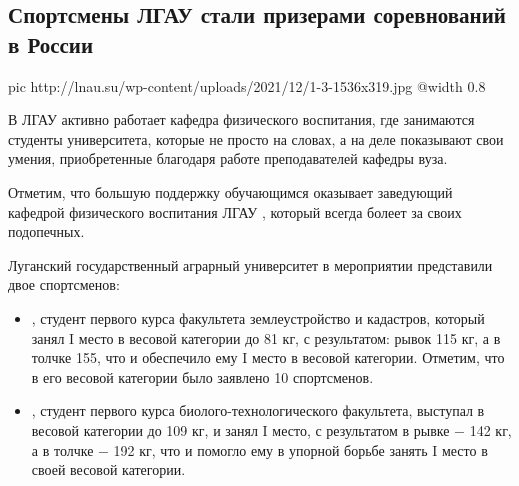  
 
 
 
 
\subsection{Спортсмены ЛГАУ стали призерами соревнований в России}
\label{sec:07_12_2021.stz.edu.lnr.lgau.1.prizery_sorevy_rossia}



\ifcmt
  pic http://lnau.su/wp-content/uploads/2021/12/1-3-1536x319.jpg
  @width 0.8
\fi

В ЛГАУ активно работает кафедра физического воспитания, где занимаются студенты
университета, которые не просто на словах, а на деле показывают свои умения,
приобретенные благодаря работе преподавателей кафедры вуза.

Отметим, что большую поддержку обучающимся оказывает заведующий кафедрой
физического воспитания ЛГАУ , который всегда болеет
за своих подопечных.

Луганский государственный аграрный университет в мероприятии представили двое
спортсменов:

\begin{itemize} %
\item {}, студент первого курса факультета землеустройство и
кадастров, который занял I место в весовой категории до 81 кг, с результатом:
рывок 115 кг, а в толчке 155, что и обеспечило ему I место в весовой категории.
Отметим, что в его весовой категории было заявлено 10 спортсменов.

\item {}, студент первого курса биолого-технологического
факультета, выступал в весовой категории до 109 кг, и занял I место, с
результатом в рывке − 142 кг, а в толчке − 192 кг, что и помогло ему в упорной
борьбе занять I место в своей весовой категории.
\end{itemize} %

